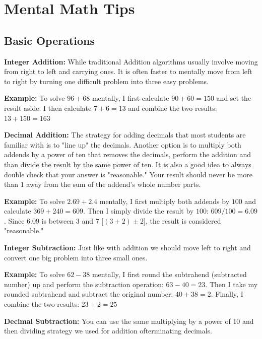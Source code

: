 \documentclass{article}
\begin{document}
\section{Mental Math Tips}

\subsection{Basic Operations}
    \textbf{Integer Addition:} While traditional Addition algorithms usually involve moving from right to left and carrying ones. 
    It is often faster to mentally move from left to right by turning one difficult problem into three easy problems.

    \bigskip
    \textbf{Example:} To solve $96+68$ mentally, I first calculate $90+60=150$ and set the result aside. I then calculate $7+6=13$ and combine the two results: $13+150=163$

\bigskip
\bigskip

    \textbf{Decimal Addition:} The strategy for adding decimals that most students are familiar with is to "line up" the decimals. Another option is to multiply both addends by a power of ten that removes the decimals, perform the addition and than divide the result by the same power of ten. It is also a good idea to always double check that your answer is "reasonable." Your result should never be more than $1$ away from the sum of the addend's whole number parts.

    \bigskip
	\textbf{Example:} To solve $2.69+2.4$ mentally, I first multiply both addends by $100$ and calculate $369+240=609$. Then I simply divide the result by $100$: $609/100=6.09$. Since $6.09$ is between $3$ and $7$ [$(3+2)\pm2$], the result is considered "reasonable."


	\bigskip
	\bigskip

    \textbf{Integer Subtraction:} Just like with addition we should move left to right and convert one big problem into three small ones.

    \bigskip
	
	\textbf{Example:} To solve $62-38$ mentally, I first round the subtrahend (subtracted number) up and perform the subtraction operation: $63-40=23$. Then I take my rounded subtrahend and subtract the original number: $40+38=2$.  Finally, I combine the two results: $23+2=25$

	\bigskip
	\bigskip

    \textbf{Decimal Subtraction:} You can use the same multiplying by a power of $10$ and then dividing strategy we used for addition ofterminating decimals.
\end{document}
